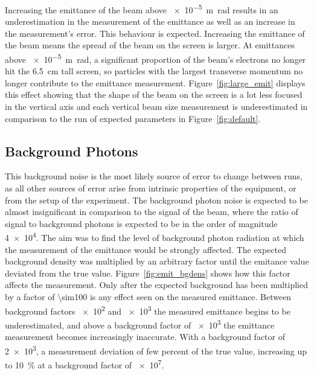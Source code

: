 Increasing the emittance of the beam above \SI{e-5}{\meter\radian} results in an
underestimation in the measurement of the emittance as well as an increase in
the measurement's error. This behaviour is expected. Increasing the emittance of
the beam means the spread of the beam on the screen is larger. At emittances
above \SI{e-5}{\meter\radian}, a significant proportion of the beam's electrons
no longer hit the \SI{6.5}{\centi\meter} tall screen, so particles with the
largest transverse momentum no longer contribute to the emittance measurement.
Figure~\ref{fig:large_emit} displays this effect showing that the shape of the
beam on the screen is a lot less focused in the vertical axis and each vertical
beam size measurement is underestimated in comparison to the run of expected
parameters in Figure~\ref{fig:default}.



\subsection{Background Photons}

This background noise is the most likely source of error to change between runs,
as all other sources of error arise from intrinsic properties of the equipment,
or from the setup of the experiment. The background photon noise is expected to
be almost insignificant in comparison to the signal of the beam, where the ratio
of signal to background photons is expected to be in the order of magnitude
\num{4e4}. The aim was to find the level of background photon radiation at which
the measurement of the emittance would be strongly affected.  The expected
background density was multiplied by an arbitrary factor until the emitance
value deviated from the true value.  Figure~\ref{fig:emit_bgdens} shows how this
factor affects the measurement. Only after the expected background has been
multiplied by a factor of \num{\sim100} is any effect seen on the measured
emittance. Between background factors \num{e2} and \num{e3} the measured
emittance begins to be underestimated, and above a background factor of \num{e3}
the emittance measurement becomes increasingly inaccurate.  With a background
factor of \num{2e3}, a measurement deviation of few percent of the true value,
increasing up to \SI{10}{\percent} at a background factor of \num{e7}.

